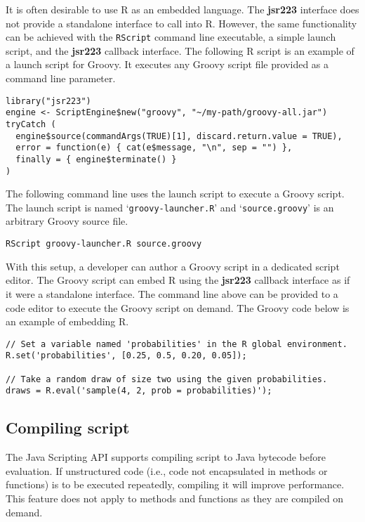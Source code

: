\documentclass[
article,
11pt, %
a4paper, %
oneside, %
headinclude,footinclude, %
]{scrartcl}
\theoremstyle{definition} %
\theoremstyle{plain} %
\theoremstyle{remark} %
\newcommand{\pkg}[1]{\textbf{#1}}
\newcommand{\code}[1]{\texttt{#1}}
\newcommand{\samp}[1]{{`\normalfont\texttt{#1}'}}
\begin{document}
It is often desirable to use R as an embedded language. The \pkg{jsr223} interface does not provide a standalone interface to call into R. However, the same functionality can be achieved with the \code{RScript} command line executable, a simple launch script, and the \pkg{jsr223} callback interface. The following R script is an example of a launch script for Groovy. It executes any Groovy script file provided as a command line parameter.

\begin{verbatim}
library("jsr223")
engine <- ScriptEngine$new("groovy", "~/my-path/groovy-all.jar")
tryCatch (
  engine$source(commandArgs(TRUE)[1], discard.return.value = TRUE),
  error = function(e) { cat(e$message, "\n", sep = "") },
  finally = { engine$terminate() }
)
\end{verbatim}

The following command line uses the launch script to execute a Groovy script. The launch script is named \samp{groovy-launcher.R} and \samp{source.groovy} is an arbitrary Groovy source file.

\begin{verbatim}
RScript groovy-launcher.R source.groovy
\end{verbatim}

With this setup, a developer can author a Groovy script in a dedicated script editor. The Groovy script can embed R using the \pkg{jsr223} callback interface as if it were a standalone interface. The command line above can be provided to a code editor to execute the Groovy script on demand. The Groovy code below is an example of embedding R.

\begin{verbatim}
// Set a variable named 'probabilities' in the R global environment.
R.set('probabilities', [0.25, 0.5, 0.20, 0.05]);

// Take a random draw of size two using the given probabilities.
draws = R.eval('sample(4, 2, prob = probabilities)');
\end{verbatim}

\subsection{Compiling script}

The Java Scripting API supports compiling script to Java bytecode before evaluation. If unstructured code (i.e., code not encapsulated in methods or functions) is to be executed repeatedly, compiling it will improve performance. This feature does not apply to methods and functions as they are compiled on demand.
\end{document}

